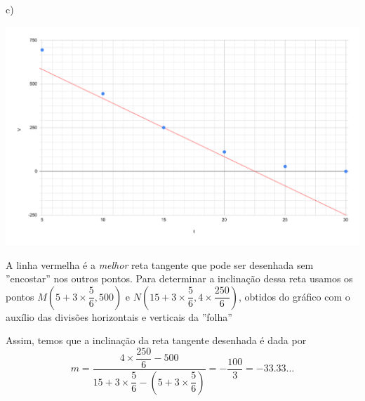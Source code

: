 \documentclass[brazilian, fleqn]{article}
\begin{document}
c)
\begin{center}
    \includegraphics[width=\textwidth]{chart.pdf}
\end{center}
A linha vermelha é a \textit{melhor} reta tangente que pode ser desenhada
sem ''encostar'' nos outros pontos. Para determinar a inclinação dessa reta
usamos os pontos 
\(M\left(5+3\times \dfrac{5}{6},500\right)\) e 
\(N\left(15+3\times\dfrac{5}{6},4\times\dfrac{250}{6}\right)\),
obtidos do gráfico com o auxílio das divisões horizontais e verticais da ''folha''

Assim, temos que a inclinação da reta tangente desenhada é dada por 
\[
    m = \frac{4\times\dfrac{250}{6}-500}
    {15+3\times\dfrac{5}{6}-\left(5+3\times \dfrac{5}{6}\right)} = 
    -\frac{100}{3}=\num{-33.33}\ldots
\]
\end{document}
